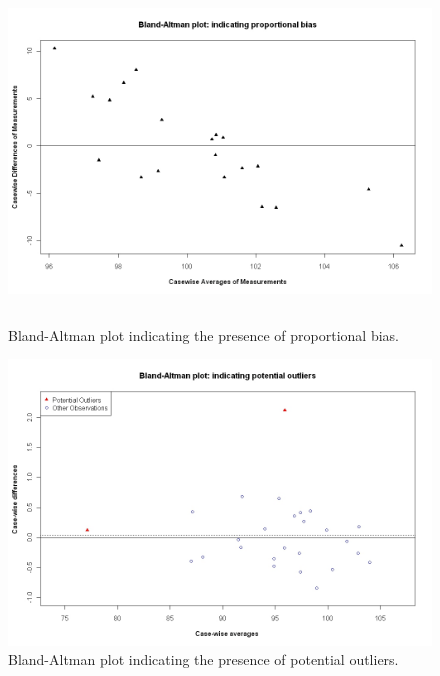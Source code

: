 \documentclass[Main.tex]{subfiles}
\begin{document}
	\begin{figure}[h!]
		\begin{center}
			\includegraphics[height=90mm]{images/PropBias.jpeg}
			\caption{Bland-Altman plot indicating the presence of proportional bias.}\label{PropBias}
		\end{center}
	\end{figure}
	
	\begin{figure}[h!]
		\begin{center}
			\includegraphics[width=125mm]{images/BAOutliers.jpeg}
			\caption{Bland-Altman plot indicating the presence of potential outliers.}\label{Outliers}
		\end{center}
	\end{figure}





	
\end{document}
